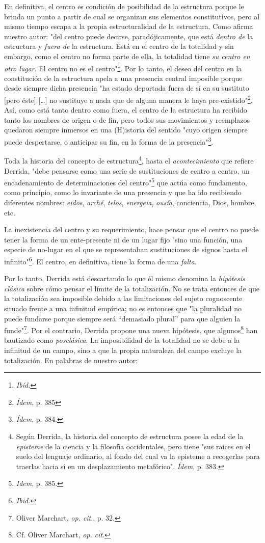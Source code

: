 \documentclass{book}
\begin{document}
En definitiva, el centro es condición de posibilidad de la estructura
porque le brinda un punto a partir de cual se organizan sus elementos
constitutivos, pero al mismo tiempo escapa a la propia estructuralidad
de la estructura. Como afirma nuestro autor: "del centro puede decirse,
paradójicamente, que está \emph{dentro de} la estructura y \emph{fuera
de} la estructura. Está en el centro de la totalidad y sin embargo, como
el centro no forma parte de ella, la totalidad tiene \emph{su centro en
otro lugar}. El centro no es el centro"\footnote{\emph{Ibíd.}}. Por lo
tanto, el deseo del centro en la constitución de la estructura apela a
una presencia central imposible porque desde siempre dicha presencia "ha
estado deportada fuera de sí en su sustituto {[}pero éste{]}
{[}\ldots{]} no sustituye a nada que de alguna manera le haya
pre-existido"\footnote{\emph{Ídem}, p. 385}. Así, como está tanto dentro
como fuera, el centro de la estructura ha recibido tanto los nombres de
origen o de fin, pero todos sus movimientos y reemplazos quedaron
siempre inmersos en una (H)istoria del sentido "cuyo origen siempre
puede despertarse, o anticipar su fin, en la forma de la
presencia"\footnote{\emph{Ídem}, p. 384.}.

Toda la historia del concepto de estructura\footnote{Según Derrida, la
  historia del concepto de estructura posee la edad de la
  \emph{episteme} de la ciencia y la filosofía occidentales, pero tiene
  "sus raíces en el suelo del lenguaje ordinario, al fondo del cual va
  la episteme a recogerlas para traerlas hacia sí en un desplazamiento
  metafórico". \emph{Ídem}, p. 383.}, hasta el \emph{acontecimiento} que
refiere Derrida, "debe pensarse como una serie de sustituciones de
centro a centro, un encadenamiento de determinaciones del
centro"\footnote{\emph{Idem}, p. 385.} que actúa como fundamento, como
principio, como lo invariante de una presencia y que ha ido recibiendo
diferentes nombres: \emph{eidos}, \emph{arché}, \emph{telos},
\emph{energeia}, \emph{ousía}, conciencia, Dios, hombre, etc.

La inexistencia del centro y su requerimiento, hace pensar que el centro
no puede tener la forma de un ente-presente ni de un lugar fijo "sino
una función, una especie de no-lugar en el que se representaban
sustituciones de signos hasta el infinito"\footnote{\emph{Ibid.}}. El
centro, en definitiva, tiene la forma de una \emph{falta}.

Por lo tanto, Derrida está descartando lo que él mismo denomina la
\emph{hipótesis clásica} sobre cómo pensar el límite de la totalización.
No se trata entonces de que la totalización sea imposible debido a las
limitaciones del sujeto cognoscente situado frente a una infinitud
empírica; no es entonces que "la pluralidad no puede fundarse porque
siempre será ``demasiado plural'' para que alguien la funde"\footnote{Oliver
  Marchart, \emph{op. cit}., p. 32.}. Por el contrario, Derrida propone
una nueva hipótesis, que algunos\footnote{Cf. Oliver Marchart, \emph{op.
  cit}.} han bautizado como \emph{posclásica}. La imposibilidad de la
totalidad no se debe a la infinitud de un campo, sino a que la propia
naturaleza del campo excluye la totalización. En palabras de nuestro
autor:
\end{document}
